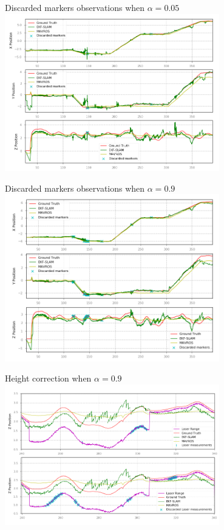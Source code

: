 \documentclass[serif]{beamer}
\begin{document}
    \begin{frame}{Discarded markers observations when $\alpha=0.05$}
        \centering
        \includegraphics[width=0.7\textwidth]{Images/fig24-nees-95-path-discarded-markers.png}
    \end{frame}

    \begin{frame}{Discarded markers observations when $\alpha=0.9$}
        \centering
        \includegraphics[width=0.7\textwidth]{Images/fig24-nees-10-path-discarded-markers.png}
    \end{frame}

    \begin{frame}{Height correction when $\alpha=0.9$}
        \centering
        \includegraphics[width=0.7\textwidth]{Images/fig23-laser-chi2-detail.png}
    \end{frame}
\end{document}
